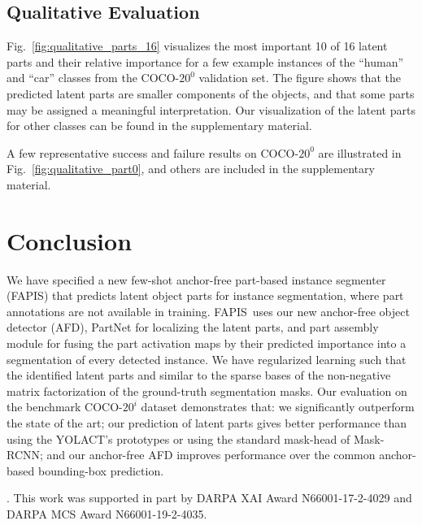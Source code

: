 \documentclass[final]{cvpr}
\def\Approach{FAPIS}
\begin{document}
\subsection{Qualitative Evaluation}
Fig.~\ref{fig:qualitative_parts_16} visualizes the most important 10 of 16 latent parts and their relative importance for a few example instances of the ``human'' and ``car'' classes from the COCO-$20^0$ validation set. The figure shows that the predicted latent parts are smaller components of the objects, and that some parts may be assigned a meaningful interpretation.  Our visualization of the latent parts for other classes can be found in the supplementary material.

A few representative success and failure results on COCO-$20^0$ are illustrated in Fig.~\ref{fig:qualitative_part0}, and others are included in the supplementary material. %


\section{Conclusion}
\label{sec:conclusions}
We have specified a new few-shot anchor-free part-based instance segmenter (\Approach) that predicts latent object parts for instance segmentation, where part annotations are not available in training. \Approach~uses our new anchor-free object detector (AFD), PartNet for localizing the latent parts, and part assembly module for fusing the part activation maps by their predicted importance into a segmentation of every detected instance. We have regularized learning such that the identified latent parts and similar to the sparse bases of the non-negative matrix factorization of the ground-truth segmentation masks. Our evaluation on the benchmark COCO-$20^i$ dataset  demonstrates that: we significantly outperform the state of the art; our prediction of latent parts gives better performance than using the YOLACT's prototypes or using the standard mask-head of Mask-RCNN; and our anchor-free AFD improves performance over the common anchor-based bounding-box prediction. 

\vspace{10pt}

. This work was supported in part by DARPA XAI Award N66001-17-2-4029 and DARPA MCS Award N66001-19-2-4035.
\end{document}
